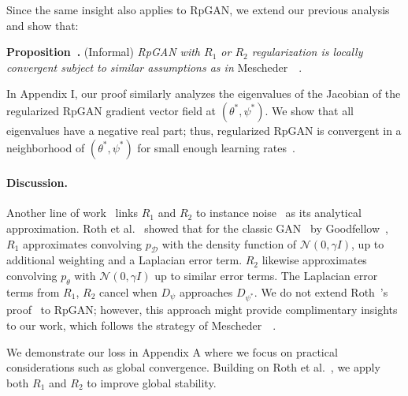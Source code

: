 Since the same insight also applies to RpGAN, 
we extend our previous analysis and show that:

\vspace{0.5ex}
\noindent \textbf{Proposition~.} (Informal) \emph{RpGAN with $R_1$ or $R_2$ regularization is locally convergent subject to similar assumptions as in} Mescheder~\etal~\cite{r1}.
\vspace{0.5ex}

In Appendix I, our proof similarly analyzes the eigenvalues of the Jacobian of the regularized RpGAN gradient vector field at $(\theta^*,\psi^*)$. We show that all eigenvalues have a negative real part; thus, regularized RpGAN is convergent in a neighborhood of $(\theta^*,\psi^*)$ for small enough learning rates~\cite{r1}.

\vspace{-1ex}
\paragraph{Discussion.}
Another line of work~\cite{r1r2} links $R_1$ and $R_2$ to instance noise~\cite{instancenoise} as its analytical approximation. Roth et al.~\cite{r1r2} showed that for the classic GAN~\cite{gan} by Goodfellow~\etal, $R_1$ approximates convolving $p_\mathcal{D}$ with the density function of $\mathcal{N}(0, \gamma I)$, up to additional weighting and a Laplacian error term. $R_2$ likewise approximates convolving $p_\theta$ with $\mathcal{N}(0, \gamma I)$ up to similar error terms. The Laplacian error terms from $R_1$, $R_2$ cancel when $D_\psi$ approaches $D_{\psi^*}$. We do not extend Roth~\etal's proof~\cite{r1r2} to RpGAN; however, this approach might provide complimentary insights to our work, which follows the strategy of Mescheder~\etal~\cite{r1}. 

We demonstrate our loss in Appendix A where we focus on practical considerations such as global convergence. Building on Roth et al.~\cite{r1r2}, we apply both $R_1$ and $R_2$ to improve global stability.